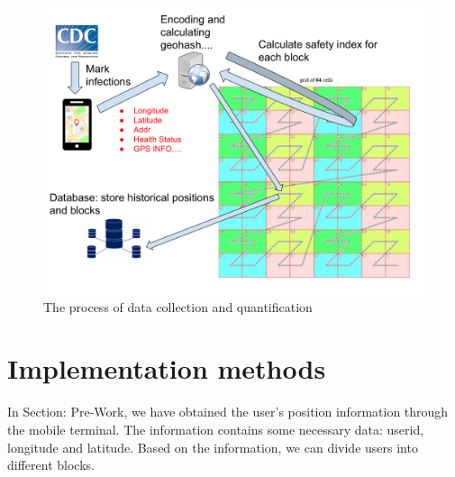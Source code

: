 \documentclass[sigplan,screen]{acmart}
\begin{document}
\begin{figure}[htb]
	\centering\includegraphics[width=\linewidth]{process.pdf}
	\caption{The process of data collection and quantification}
\end{figure}
\section{Implementation methods}
In Section: Pre-Work, we have obtained the user's position information through the mobile terminal.
The information contains some necessary data: userid, longitude and latitude.
Based on the information, we can divide users into different blocks.
\end{document}
